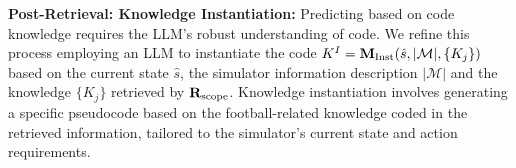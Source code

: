 

\textbf{Post-Retrieval: Knowledge Instantiation:} Predicting based on code knowledge requires the LLM's robust understanding of code.  We refine this process employing an LLM to instantiate the code $K^I=\mathbf{M}_{\rm Inst}(\hat s, |\mathcal{M}|, \{K_j\})$ based on the current state $\hat s$, the simulator information description $|\mathcal{M}|$ and the knowledge $\{K_j\}$ retrieved by $\mathbf{R}_{\rm scope}$.
Knowledge instantiation involves generating a specific pseudocode based on the football-related knowledge coded in the retrieved information, tailored to the simulator's current state and action requirements. 

